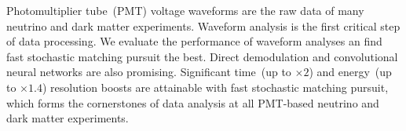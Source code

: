 Photomultiplier tube~(PMT) voltage waveforms are the raw data of many neutrino and dark matter experiments. Waveform analysis is the first critical step of data processing. We evaluate the performance of waveform analyses an find fast stochastic matching pursuit the best.  Direct demodulation and convolutional neural networks are also promising.  Significant time~(up to $\times 2$) and energy~(up to $\times 1.4$) resolution boosts are attainable with fast stochastic matching pursuit, which forms the cornerstones of data analysis at all PMT-based neutrino and dark matter experiments.